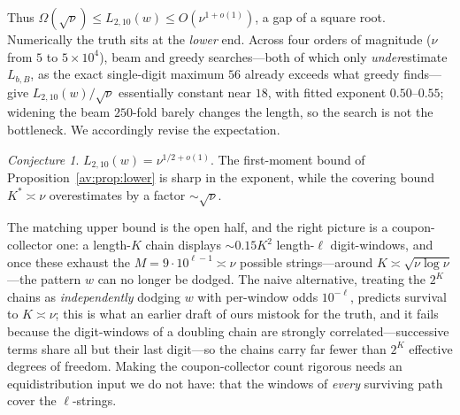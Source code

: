 \documentclass[a4paper]{article}
\theoremstyle{plain}
\theoremstyle{definition}
\theoremstyle{remark}
\newtheorem{conjecture}{Conjecture}[subsection]
\newcommand{\Lbb}[1][b,B]{L_{#1}}
\begin{document}
Thus $\Omega(\sqrt{\nu})\le\Lbb[2,10](w)\le O(\nu^{1+o(1)})$, a gap of a square root. Numerically the truth sits at the \emph{lower} end. Across four orders of magnitude ($\nu$ from $5$ to $5\times10^{4}$), beam and greedy searches---both of which only \emph{under}estimate $\Lbb$, as the exact single-digit maximum $56$ already exceeds what greedy finds---give $\Lbb[2,10](w)/\sqrt\nu$ essentially constant near $18$, with fitted exponent $0.50$--$0.55$; widening the beam $250$-fold barely changes the length, so the search is not the bottleneck. We accordingly revise the expectation.

\begin{conjecture}\label{av:conj:sqrt}
$\Lbb[2,10](w)=\nu^{1/2+o(1)}$. The first-moment bound of Proposition~\ref{av:prop:lower} is sharp in the exponent, while the covering bound $K^{*}\asymp\nu$ overestimates by a factor $\sim\sqrt\nu$.
\end{conjecture}

The matching upper bound is the open half, and the right picture is a coupon-collector one: a length-$K$ chain displays $\sim0.15K^{2}$ length-$\ell$ digit-windows, and once these exhaust the $M=9\cdot10^{\ell-1}\asymp\nu$ possible strings---around $K\asymp\sqrt{\nu\log\nu}$---the pattern $w$ can no longer be dodged. The naive alternative, treating the $2^{K}$ chains as \emph{independently} dodging $w$ with per-window odds $10^{-\ell}$, predicts survival to $K\asymp\nu$; this is what an earlier draft of ours mistook for the truth, and it fails because the digit-windows of a doubling chain are strongly correlated---successive terms share all but their last digit---so the chains carry far fewer than $2^{K}$ effective degrees of freedom. Making the coupon-collector count rigorous needs an equidistribution input we do not have: that the windows of \emph{every} surviving path cover the $\ell$-strings.
\end{document}
